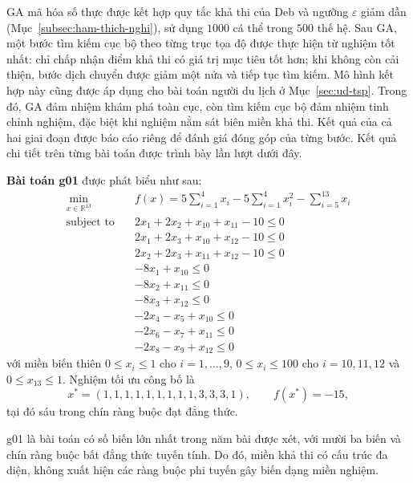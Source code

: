GA mã hóa số thực được kết hợp quy tắc khả thi của Deb và ngưỡng
$\varepsilon$ giảm dần (Mục~\ref{subsec:ham-thich-nghi}), sử dụng
$1000$ cá thể trong $500$ thế hệ. Sau GA, một bước tìm kiếm cục bộ
theo từng trục tọa độ được thực hiện từ nghiệm tốt nhất: chỉ chấp nhận
điểm khả thi có giá trị mục tiêu tốt hơn; khi không còn cải thiện,
bước dịch chuyển được giảm một nửa và tiếp tục tìm kiếm. Mô hình kết
hợp này cũng được áp dụng cho bài toán người du lịch ở
Mục~\ref{sec:ud-tsp}. Trong đó, GA đảm nhiệm khám phá toàn cục, còn
tìm kiếm cục bộ đảm nhiệm tinh chỉnh nghiệm, đặc biệt khi nghiệm nằm
sát biên miền khả thi. Kết quả của cả hai giai đoạn được báo cáo riêng
để đánh giá đóng góp của từng bước. Kết quả chi tiết trên từng bài
toán được trình bày lần lượt dưới đây.

\vspace{1em}

\textbf{Bài toán g01} được phát biểu như sau:
\begin{equation}
\begin{aligned}
\min_{x \in \mathbb{R}^{13}} \quad
& f(x) = 5\sum_{i=1}^{4} x_i - 5\sum_{i=1}^{4} x_i^2 - \sum_{i=5}^{13} x_i \\
\text{subject to} \quad
& 2x_1 + 2x_2 + x_{10} + x_{11} - 10 \le 0 \\
& 2x_1 + 2x_3 + x_{10} + x_{12} - 10 \le 0 \\
& 2x_2 + 2x_3 + x_{11} + x_{12} - 10 \le 0 \\
& -8x_1 + x_{10} \le 0 \\
& -8x_2 + x_{11} \le 0 \\
& -8x_3 + x_{12} \le 0 \\
& -2x_4 - x_5 + x_{10} \le 0 \\
& -2x_6 - x_7 + x_{11} \le 0 \\
& -2x_8 - x_9 + x_{12} \le 0
\end{aligned}
\label{eq:g01}
\end{equation}
với miền biến thiên $0 \le x_i \le 1$ cho $i = 1,\ldots,9$,
$0 \le x_i \le 100$ cho $i = 10, 11, 12$ và $0 \le x_{13} \le 1$.
Nghiệm tối ưu công bố là
\[
x^{*} = (1,1,1,1,1,1,1,1,1,3,3,3,1), \qquad f(x^{*}) = -15,
\]
tại đó sáu trong chín ràng buộc đạt đẳng thức.

g01 là bài toán có số biến lớn nhất trong năm bài được xét, với mười
ba biến và chín ràng buộc bất đẳng thức tuyến tính. Do đó, miền khả
thi có cấu trúc đa diện, không xuất hiện các ràng buộc phi tuyến gây
biến dạng miền nghiệm.

